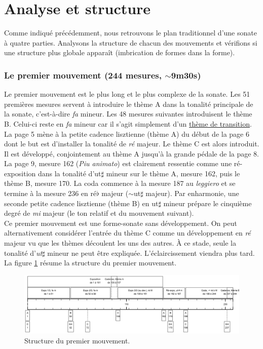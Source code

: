 \section{Analyse et structure}

Comme indiqué précédemment, nous retrouvons le plan traditionnel d'une sonate à quatre parties. Analysons la structure de chacun des mouvements et vérifions si une structure plus globale apparaît (imbrication de formes dans la forme).

\subsubsection*{Le premier mouvement (244 mesures, $\sim$9m30s)}

Le premier mouvement est le plus long et le plus complexe de la sonate. Les 51 premières mesures servent à introduire le thème A dans la tonalité principale de la sonate, c'est-à-dire \emph{fa} mineur. Les 48 mesures suivantes introduisent le thème B. Celui-ci reste en \emph{fa} mineur car il s'agit simplement d'un \underline{thème de transition}. La page 5 mène à la petite cadence lisztienne (thème A) du début de la page 6 dont le but est d'installer la tonalité de \emph{ré} majeur. Le thème C est alors introduit. Il est développé, conjointement au thème A jusqu'à la grande pédale de la page 8. La page 9, mesure 162 (\emph{Piu animato}) est clairement ressentie comme une ré-exposition dans la tonalité d'ut$\sharp$ mineur sur le thème A, mesure 162, puis le thème B, mesure 170. La coda commence à la mesure 187 au \emph{leggiero} et se termine à la mesure 236 en ré$\flat$ majeur ($\sim$ut$\sharp$ majeur). Par enharmonie, une seconde petite cadence lisztienne (thème B) en ut$\sharp$ mineur prépare le cinquième degré de \emph{mi} majeur (le ton relatif et du mouvement suivant).\\

Ce premier mouvement est une forme-sonate sans développement. On peut alternativement considérer l'entrée du thème C comme un développement en \emph{ré} majeur vu que les thèmes découlent les uns des autres. À ce stade, seule la tonalité d'\emph{ut}$\sharp$ mineur ne peut être expliquée. L'éclaircissement viendra plus tard. La figure \ref{schema-1} résume la structure du premier mouvement.

\begin{figure}[!ht]
  \begin{bigcenter}
    \includegraphics[width=17.5cm, keepaspectratio]{frise-mvt1.png}
  \end{bigcenter}
  \caption{\label{schema-1}Structure du premier mouvement.}
\end{figure}

